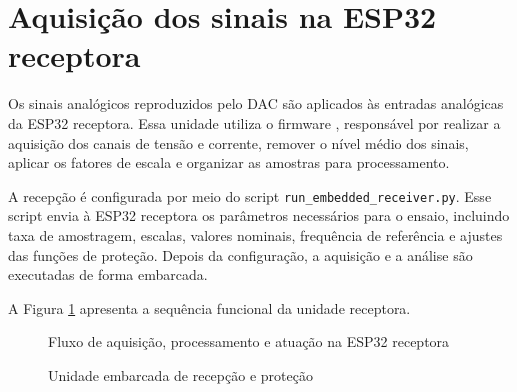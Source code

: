 \section{Aquisição dos sinais na ESP32 receptora}

Os sinais analógicos reproduzidos pelo DAC são aplicados às entradas analógicas da ESP32 receptora. Essa unidade utiliza o firmware , responsável por realizar a aquisição dos canais de tensão e corrente, remover o nível médio dos sinais, aplicar os fatores de escala e organizar as amostras para processamento.

A recepção é configurada por meio do script \texttt{run\_embedded\_receiver.py}. Esse script envia à ESP32 receptora os parâmetros necessários para o ensaio, incluindo taxa de amostragem, escalas, valores nominais, frequência de referência e ajustes das funções de proteção. Depois da configuração, a aquisição e a análise são executadas de forma embarcada.

A Figura \ref{fig:recepcao-protecao} apresenta a sequência funcional da unidade receptora.

\begin{figure}[H]
  \centering
  \caption{Fluxo de aquisição, processamento e atuação na ESP32 receptora}
  \label{fig:recepcao-protecao}
\end{figure}

\begin{figure}[H]
  \centering
  \caption{Unidade embarcada de recepção e proteção}
  \label{fig:unidade-receptora}
\end{figure}

